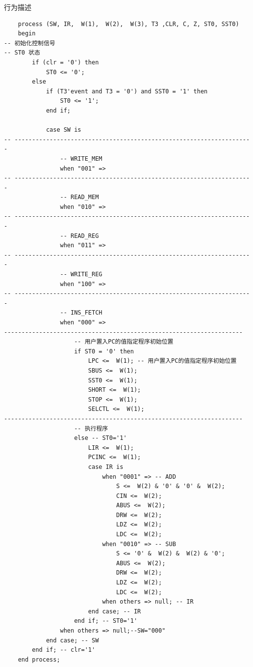 \documentclass[lang=cn,11pt,a4paper,cite=authornum]{paper}
\begin{document}
\begin{code}
\caption{行为描述\label{code:behave}}
\begin{verbatim}
    process (SW, IR,  W(1),  W(2),  W(3), T3 ,CLR, C, Z, ST0, SST0) 
    begin
-- 初始化控制信号
-- ST0 状态
        if (clr = '0') then
            ST0 <= '0';
        else
            if (T3'event and T3 = '0') and SST0 = '1' then
                ST0 <= '1';
            end if;

            case SW is
-- --------------------------------------------------------------------
                -- WRITE_MEM
                when "001" =>
-- --------------------------------------------------------------------
                -- READ_MEM
                when "010" =>
-- --------------------------------------------------------------------
                -- READ_REG
                when "011" =>
-- --------------------------------------------------------------------
                -- WRITE_REG
                when "100" =>
-- --------------------------------------------------------------------
                -- INS_FETCH
                when "000" =>
--------------------------------------------------------------------
                    -- 用户置入PC的值指定程序初始位置
                    if ST0 = '0' then
                        LPC <=  W(1); -- 用户置入PC的值指定程序初始位置
                        SBUS <=  W(1);
                        SST0 <=  W(1);
                        SHORT <=  W(1);
                        STOP <=  W(1);
                        SELCTL <=  W(1);
--------------------------------------------------------------------
                    -- 执行程序
                    else -- ST0='1'
                        LIR <=  W(1);
                        PCINC <=  W(1);
                        case IR is
                            when "0001" => -- ADD
                                S <=  W(2) & '0' & '0' &  W(2);
                                CIN <=  W(2);
                                ABUS <=  W(2);
                                DRW <=  W(2);
                                LDZ <=  W(2);
                                LDC <=  W(2);
                            when "0010" => -- SUB
                                S <= '0' &  W(2) &  W(2) & '0';
                                ABUS <=  W(2);
                                DRW <=  W(2);
                                LDZ <=  W(2);
                                LDC <=  W(2);
                            when others => null; -- IR
                        end case; -- IR
                    end if; -- ST0='1'
                when others => null;--SW="000"
            end case; -- SW
        end if; -- clr='1'
    end process;


\end{verbatim}
\end{code}
\end{document}
